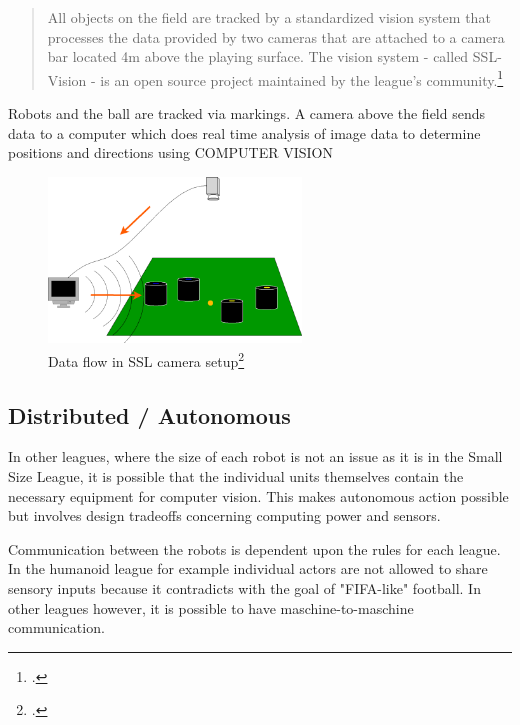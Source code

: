 \begin{quote}
All objects on the field are tracked by a standardized vision system that
processes the data provided by two cameras that are attached to a camera bar
located 4m above the playing surface. The vision system - called SSL-Vision - is
an open source project maintained by the league's community.\footcite[Cf.][]{robo_ssl_wiki}
\end{quote}

Robots and the ball are tracked via markings. A camera above the field sends
data to a computer which does real time analysis of image data to determine
positions and directions using COMPUTER VISION

\begin{savenotes}
\begin{figure}[htbp]
\begin{center}
  \includegraphics[width=0.6\textwidth]{img/ssl_dataflow.png}
  \caption[Data flow in SSL camera setup]{Data flow in SSL camera setup\footcite[][]{robo_ssl_wiki}}
  \label{fig:ssl_dataflow}
\end{center}
\end{figure}
\end{savenotes}

\subsection{Distributed / Autonomous}
In other leagues, where the size of each robot is not an issue as it is in the Small Size League, it is possible that the individual units themselves contain the necessary equipment for computer vision. This makes autonomous action possible but involves design tradeoffs concerning computing power and sensors.

Communication between the robots is dependent upon the rules for each league. In the humanoid league for example individual actors are not allowed to share sensory inputs because it contradicts with the goal of "FIFA-like" football.
In other leagues however, it is possible to have maschine-to-maschine communication.

